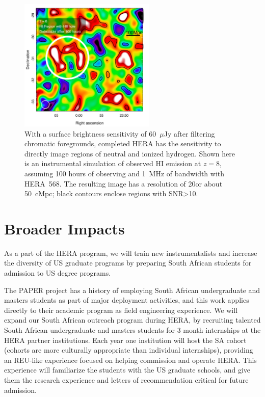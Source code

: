 \documentclass[preprint]{aastex}
\def\HI{{H{\small I }}}
\begin{document}
\begin{figure}[t] \centering
\includegraphics[height=2.5in]{plots/HERA_z8_SNR_annotated_v2.jpg}
\caption{\small 
With a surface brightness sensitivity of 60~$\mu$Jy after filtering chromatic
foregrounds, completed HERA has the sensitivity
to directly image regions of neutral and ionized hydrogen.
Shown here is an instrumental simulation of observed \HI emission at $z=8$,
assuming 100 hours of observing and 1~MHz of bandwidth with HERA~568.  The resulting
image has a resolution of 20\arcmin or about 50~cMpc; black contours
enclose regions with SNR>10.
\label{imaging}}
\end{figure}


\vspace{-0.25in}
\section{Broader Impacts}
\label{BIsec}
As a part of the HERA program, we will train new instrumentalists and increase
the diversity of US graduate programs by preparing South African students for
admission to US degree programs.

The PAPER project has a history of employing South African undergraduate and
masters students as part of major deployment activities, and this work applies
directly to their academic program as field engineering experience.  We will
expand our South African outreach program during HERA, by recruiting talented
South African undergraduate and masters students for 3 month internships at the
HERA partner institutions. Each year one institution will host the SA cohort
(cohorts are more culturally appropriate than individual internships),
providing an REU-like experience focused on helping commission and operate
HERA. This experience will familiarize the students with the US graduate
schools, and give them the research experience and letters of recommendation
critical for future admission. 
\end{document}
